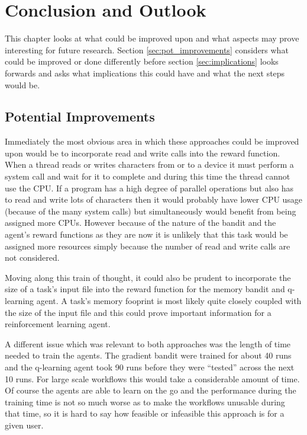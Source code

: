 
\cleardoublepage
\chapter{Conclusion and Outlook}
\label{cha:conclusion}

This chapter looks at what could be improved upon and what aspects may prove interesting for future research. Section \ref{sec:pot_improvements} considers what could be improved or done differently before section \ref{sec:implications} looks forwards and asks what implications this could have and what the next steps would be.

\section{Potential Improvements}
\label{sec:pot_improvement}

Immediately the most obvious area in which these approaches could be improved upon would be to incorporate read and write calls into the reward function. When a thread reads or writes characters from or to a device it must perform a system call and wait for it to complete and during this time the thread cannot use the CPU. If a program has a high degree of parallel operations but also has to read and write lots of characters then it would probably have lower CPU usage (because of the many system calls) but simultaneously would benefit from being assigned more CPUs. However because of the nature of the bandit and the agent’s reward functions as they are now it is unlikely that this task would be assigned more resources simply because the number of read and write calls are not considered.

Moving along this train of thought, it could also be prudent to incorporate the size of a task’s input file into the reward function for the memory bandit and q-learning agent. A task’s memory fooprint is most likely quite closely coupled with the size of the input file and this could prove important information for a reinforcement learning agent.

A different issue which was relevant to both approaches was the length of time needed to train the agents. The gradient bandit were trained for about 40 runs and the q-learning agent took 90 runs before they were “tested” across the next 10 runs. For large scale workflows this would take a considerable amount of time. Of course the agents are able to learn on the go and the performance during the training time is not so much worse as to make the workflows unusable during that time, so it is hard to say how feasible or infeasible this approach is for a given user.

